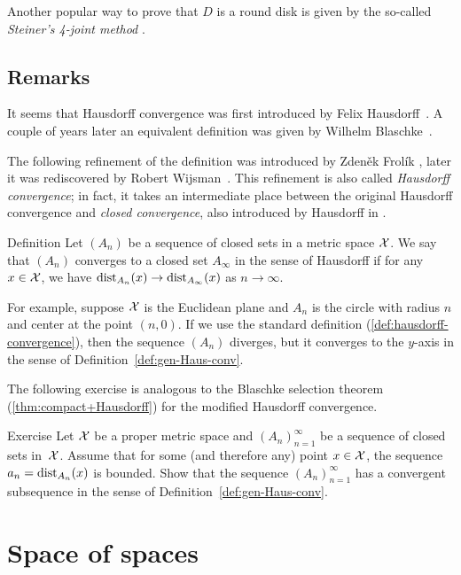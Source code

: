 Another popular way to prove that $D$ is a round disk is given by the so-called {}\emph{Steiner's 4-joint method} \cite{blaschke}.

\section{Remarks}\label{sec:H-variation}

It seems that Hausdorff convergence was first introduced by Felix Hausdorff~\cite{hausdorff}.
A couple of years later an equivalent definition was given by Wilhelm Blaschke~\cite{blaschke}.

The following refinement of the definition was introduced by  Zdeněk Frolík \cite{frolik},
later it was rediscovered by Robert Wijsman~\cite{wijsman}.  
This refinement is also called \emph{Hausdorff convergence};
in fact, it takes an intermediate place between the original Hausdorff convergence and {}\emph{closed convergence}, also introduced by Hausdorff in \cite{hausdorff}.

\begin{thm}{Definition}\label{def:gen-Haus-conv}
Let $(A_n)$ be a sequence of closed sets in a metric space $\mathcal{X}$.
We say that $(A_n)$ converges to a closed set $A_\infty$ in the sense of Hausdorff if for any $x\in\mathcal{X}$, we have
$\mathrm{dist}_{A_n}(x)\to \mathrm{dist}_{A_\infty}(x)$ as $n\to\infty$.
\end{thm}

For example, suppose $\mathcal{X}$ is the Euclidean plane and $A_n$ is the circle with radius $n$ and center at the point $(n,0)$.
If we use the standard definition (\ref{def:hausdorff-convergence}), then the sequence $(A_n)$ diverges, but it converges to the $y$-axis in the sense of Definition~\ref{def:gen-Haus-conv}.

The following exercise is analogous to the Blaschke selection theorem (\ref{thm:compact+Hausdorff}) for the modified Hausdorff convergence.

\begin{thm}{Exercise}\label{ex:generalized-selection}
Let $\mathcal{X}$ be a proper metric space
and $(A_n)_{n=1}^\infty$ be a sequence of closed sets in~$\mathcal{X}$.
Assume that for some (and therefore any) point  $x\in\mathcal{X}$, 
the sequence $a_n=\mathrm{dist}_{A_n}(x)$ is bounded.
Show that the sequence  $(A_n)_{n=1}^\infty$ has a convergent subsequence in the sense of Definition~\ref{def:gen-Haus-conv}.
\end{thm}

\chapter{Space of spaces}


